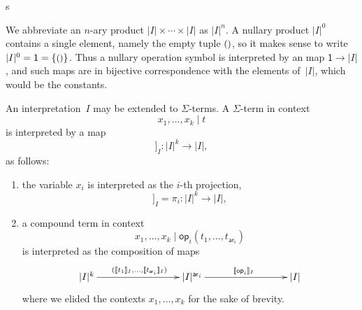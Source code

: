 s\documentclass{amsart}
\newcommand{\carrier}[1]{|#1|} %
\newcommand{\set}[1]{\{#1\}} %
\newcommand{\op}[1]{\mathsf{op}_{#1}} %
\newcommand{\arity}[1]{\mathsf{ar}_{#1}} %
\newcommand{\one}{\mathsf{1}} %
\newcommand{\unit}{{\text{\small$()$}}} %
\newcommand{\sem}[1]{[\![#1]\!]} %
\begin{document}
We abbreviate an $n$-ary product $\carrier{I} \times \cdots \times \carrier{I}$ as $\carrier{I}^n$. A
nullary product $\carrier{I}^0$ contains a single element, namely the empty tuple
$\unit$, so it makes sense to write $\carrier{I}^0 = \one = \set{\unit}$. Thus a nullary
operation symbol is interpreted by an map $\one \to \carrier{I}$, and such maps are in
bijective correspondence with the elements of~$\carrier{I}$, which would be the constants.

An interpretation~$I$ may be extended to $\Sigma$-terms. A $\Sigma$-term in context
%
\begin{equation*}
  x_1, \ldots, x_k \mid t
\end{equation*}
%
is interpreted by a map
%
\begin{equation*}
  \sem{x_1, \ldots, x_k \mid t}_I : \carrier{I}^k \to \carrier{I},
\end{equation*}
%
as follows:
%
\begin{enumerate}
\item the variable $x_i$ is interpreted as the $i$-th projection,
  \begin{equation*}
    \sem{x_1, \ldots, x_k \mid  x_i}_I = \pi_i : \carrier{I}^k \to \carrier{I},
  \end{equation*}
\item a compound term in context
  \begin{equation*}
    x_1, \ldots, x_k \mid \op{i}(t_1, \ldots, t_{\arity{i}})
  \end{equation*}
  is interpreted as the composition of maps
  \begin{equation*}
    \xymatrix@+6em{
      {\carrier{I}^k} \ar[r]^{(\sem{t_1}_I, \ldots, \sem{t_{\arity{i}}}_I)}
      &
      {\carrier{I}^{\arity{i}}} \ar[r]^{\sem{\op{i}}_I}
      &
      {\carrier{I}}
    }
  \end{equation*}
  where we elided the contexts $x_1, \ldots, x_k$ for the sake of brevity.
\end{enumerate}
\end{document}
